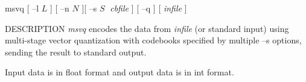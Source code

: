 % 
% 
% 
% 
%                                                                        
%
\hypertarget{msvq}{}

\begin{synopsis}
\item [msvq] [ --l $L$ ] [ --n $N$ ][ --s $S \;$ {\em cbfile} ] [ --q ] [ {\em infile} ]
\end{synopsis}

\begin{qsection}{DESCRIPTION}
{\em msvq} encodes the data from {\em infile} (or standard input) 
using multi-stage vector quantization 
with codebooks specified by multiple --s options,
sending the result to standard output.

Input data is in float format and output data is in int format.
\end{qsection}

